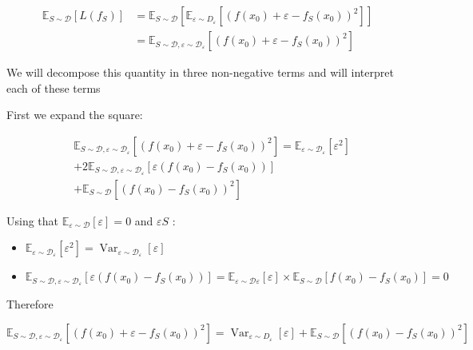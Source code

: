 $$
\begin{aligned}
\mathbb{E}_{S \sim \mathscr{D}}\left[L\left(f_{S}\right)\right] & =\mathbb{E}_{S \sim \mathscr{D}}\left[\mathbb{E}_{\varepsilon \sim D_{\varepsilon}}\left[\left(f\left(x_{0}\right)+\varepsilon-f_{S}\left(x_{0}\right)\right)^{2}\right]\right] \\
& =\mathbb{E}_{S \sim \mathscr{D}, \varepsilon \sim \mathscr{D}_{\varepsilon}}\left[\left(f\left(x_{0}\right)+\varepsilon-f_{S}\left(x_{0}\right)\right)^{2}\right]
\end{aligned}
$$

We will decompose this quantity in three non-negative terms and will interpret each of these terms

First we expand the square:

$$
\begin{aligned}
& \mathbb{E}_{S \sim \mathscr{D}, \varepsilon \sim \mathscr{D}_{\varepsilon}}\left[\left(f\left(x_{0}\right)+\varepsilon-f_{S}\left(x_{0}\right)\right)^{2}\right]=\mathbb{E}_{\varepsilon \sim \mathscr{D}_{\varepsilon}}\left[\varepsilon^{2}\right] \\
&+2 \mathbb{E}_{S \sim \mathscr{D}, \varepsilon \sim \mathscr{D}_{\varepsilon}}\left[\varepsilon\left(f\left(x_{0}\right)-f_{S}\left(x_{0}\right)\right)\right] \\
&+\mathbb{E}_{S \sim \mathscr{D}}\left[\left(f\left(x_{0}\right)-f_{S}\left(x_{0}\right)\right)^{2}\right]
\end{aligned}
$$

Using that $\mathbb{E}_{\varepsilon \sim \mathscr{D}}[\varepsilon]=0$ and $\varepsilon S$ :

\begin{itemize}
  \item $\mathbb{E}_{\varepsilon \sim \mathscr{D}_{\varepsilon}}\left[\varepsilon^{2}\right]=\operatorname{Var}_{\varepsilon \sim \mathscr{D}_{\varepsilon}}[\varepsilon]$
  \item $\mathbb{E}_{S \sim \mathscr{D}, \varepsilon \sim \mathscr{D}_{\varepsilon}}\left[\varepsilon\left(f\left(x_{0}\right)-f_{S}\left(x_{0}\right)\right)\right]=\mathbb{E}_{\varepsilon \sim \mathscr{D} \varepsilon}[\varepsilon] \times \mathbb{E}_{S \sim \mathscr{D}}\left[f\left(x_{0}\right)-f_{S}\left(x_{0}\right)\right]=0$
\end{itemize}

Therefore

$\mathbb{E}_{S \sim \mathscr{D}, \varepsilon \sim \mathscr{D}_{\varepsilon}}\left[\left(f\left(x_{0}\right)+\varepsilon-f_{S}\left(x_{0}\right)\right)^{2}\right]=\operatorname{Var}_{\varepsilon \sim D_{\varepsilon}}[\varepsilon]+\mathbb{E}_{S \sim \mathscr{D}}\left[\left(f\left(x_{0}\right)-f_{S}\left(x_{0}\right)\right)^{2}\right]$

